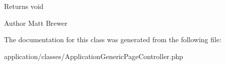 \begin{DoxyReturn}{Returns}
void 
\end{DoxyReturn}
\begin{DoxyAuthor}{Author}
Matt Brewer 
\end{DoxyAuthor}


The documentation for this class was generated from the following file:\begin{DoxyCompactItemize}
\item 
application/classes/ApplicationGenericPageController.php\end{DoxyCompactItemize}
